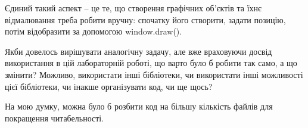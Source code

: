 Єдиний такий аспект – це те, що створення графічних об’єктів та їхнє відмалювання треба робити вручну\+: спочатку його створити, задати позицію, потім відобразити за допомогою window.\+draw().


\begin{DoxyEnumerate}
\item Якби довелось вирішувати аналогічну задачу, але вже враховуючи досвід використання в цій лабораторній роботі, що варто було б робити так само, а що змінити? Можливо, використати інші бібліотеки, чи використати інші можливості цієї бібліотеки, чи інакше організувати код, чи ще щось?
\end{DoxyEnumerate}

На мою думку, можна було б розбити код на більшу кількість файлів для покращення читабельності. 